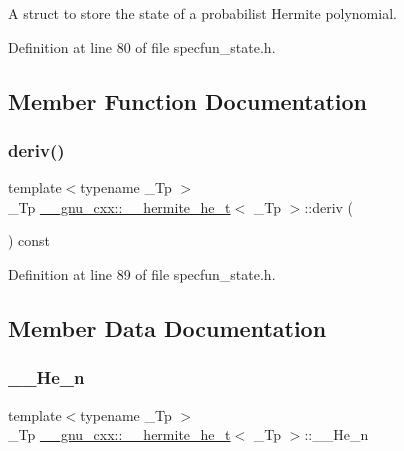 A struct to store the state of a probabilist Hermite polynomial. 

Definition at line 80 of file specfun\+\_\+state.\+h.



\subsection{Member Function Documentation}
\mbox{\label{struct____gnu__cxx_1_1____hermite__he__t_a19c1df6940043e1b106b8cf70bddd60e}} 
\subsubsection{\texorpdfstring{deriv()}{deriv()}}
{\footnotesize\ttfamily template$<$typename \+\_\+\+Tp $>$ \\
\+\_\+\+Tp \hyperlink{struct____gnu__cxx_1_1____hermite__he__t}{\+\_\+\+\_\+gnu\+\_\+cxx\+::\+\_\+\+\_\+hermite\+\_\+he\+\_\+t}$<$ \+\_\+\+Tp $>$\+::deriv (\begin{DoxyParamCaption}{ }\end{DoxyParamCaption}) const\hspace{0.3cm}{\ttfamily [inline]}}



Definition at line 89 of file specfun\+\_\+state.\+h.



\subsection{Member Data Documentation}
\mbox{\label{struct____gnu__cxx_1_1____hermite__he__t_ad1a90d0045c4fe567482ebd8cf875842}} 
\subsubsection{\texorpdfstring{\+\_\+\+\_\+\+He\+\_\+n}{\_\_He\_n}}
{\footnotesize\ttfamily template$<$typename \+\_\+\+Tp $>$ \\
\+\_\+\+Tp \hyperlink{struct____gnu__cxx_1_1____hermite__he__t}{\+\_\+\+\_\+gnu\+\_\+cxx\+::\+\_\+\+\_\+hermite\+\_\+he\+\_\+t}$<$ \+\_\+\+Tp $>$\+::\+\_\+\+\_\+\+He\+\_\+n}



